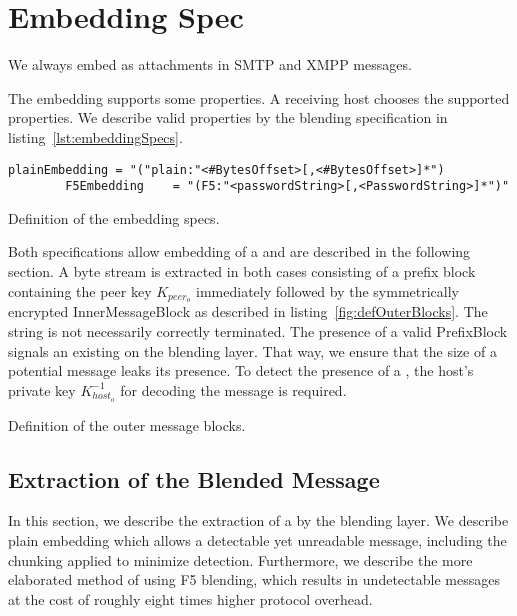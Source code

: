 \section{Embedding Spec}
We always embed \VortexMessages{} as attachments in SMTP and XMPP messages. 

The embedding supports some properties. A receiving host chooses the supported properties. We describe valid properties by the blending specification in listing~\ref{lst:embeddingSpecs}.

\begin{lstfloat}[h!]
	\begin{lstlisting}[language=EBNF]
		plainEmbedding = "("plain:"<#BytesOffset>[,<#BytesOffset>]*")
		F5Embedding    = "(F5:"<passwordString>[,<PasswordString>]*")"
	\end{lstlisting}
	\caption{Definition of the embedding specs.}
	\label{lst:embeddingSpecs}
\end{lstfloat}

Both specifications allow embedding of a \VortexMessage{} and are described in the following section. A byte stream is extracted in both cases consisting of a prefix block containing the peer key $K_{peer_o}$ immediately followed by the symmetrically encrypted InnerMessageBlock as described in listing~\ref{fig:defOuterBlocks}. The string is not necessarily correctly terminated. The presence of a valid PrefixBlock signals an existing \VortexMessage{} on the blending layer. That way, we ensure that the size of a potential message leaks its presence. To detect the presence of a \VortexMessage{}, the host's private key $K^{-1}_{host_o}$ for decoding the message is required. 

\begin{lstfloat}[ht]
	
	\caption{Definition of the outer message blocks.}
	\label{fig:defOuterBlocks}
\end{lstfloat}

\subsection{Extraction of the Blended Message}
In this section, we describe the extraction of a \VortexMessage{} by the blending layer. We describe plain embedding which allows a detectable yet unreadable message, including the chunking applied to minimize detection. Furthermore, we describe the more elaborated method of using F5  blending, which results in undetectable messages at the cost of roughly eight times higher protocol overhead.

